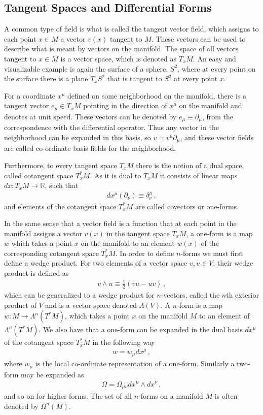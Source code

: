 \subsection*{Tangent Spaces and Differential Forms}
A common type of field is what is called the tangent vector field, which assigns to each point $x\in M$ a vector $v(x)$ tangent to $M$. These vectors can be used to describe what is meant by vectors  on the manifold. The space of all vectors tangent to $x\in M$ is a vector space, which is denoted as $T_{x}M$. An easy and visualizable example is again the surface of a sphere, $S^{2}$, where at every point on the surface there is a plane $T_{x}S^{2}$ that is tangent to $S^{2}$ at every point $x$.

For a coordinate $x^{\mu}$ defined on some neighborhood on the manifold, there is a tangent vector $e_{\mu}\in T_{x}M$ pointing in the direction of $x^{\mu}$ on the manifold and denotes  at unit speed. These vectors can be denoted by $e_{\mu}\equiv \partial_{\mu}$, from the correspondence with the differential operator. Thus any vector in the neighborhood can be expanded in this basis, so $v=v^{\mu}\partial_{\mu}$, and these vector fields are called co-ordinate basis fields for the neighborhood.

Furthermore, to every tangent space $T_{x}M$ there is the notion of a dual space, called cotangent space $T^{*}_{x}M$. As it is dual to $T_{x}M$ it consists of linear maps $dx:T_{x}M\rightarrow \mathbb{R}$, such that
\begin{align}
    dx^{\mu}(\partial_{\nu})\equiv \delta^{\mu}_{\nu}\,,
\end{align}
and elements of the cotangent space $T^{*}_{x}M$ are called covectors or one-forms.

In the same sense that a vector field is a function that at each point in the manifold assigns a vector $v(x)$ in the tangent space $T_{x}M$, a one-form is a map $w$ which takes a point $x$ on the manifold to an element $w(x)$ of the corresponding cotangent space $T^{*}_{x}M$. In order to define $n$-forms we must first define a wedge product. For two elements of a vector space $v,u\in V$, their wedge product is defined as
\begin{align}
    v\wedge u\equiv\frac{1}{2}(vu-uv)\,,
\end{align}
which can be generalized to a wedge product for $n$-vectors, called the $n$th exterior product of $V$ and is a vector space denoted $\Lambda(V)$. A $n$-form is a map $w:M\rightarrow \Lambda^{n}(T^{*}M)$, which takes a point $x$ on the manifold $M$ to an element of $\Lambda^{n}(T^{*}M)$. We also have that a one-form can be expanded in the dual basis $dx^{\mu}$ of the cotangent space $T^{*}_{x}M$ in the following way
\begin{align}
    w=w_{\mu}dx^{\mu}\,,
\end{align}
where $w_{\mu}$ is the local co-ordinate representation of a one-form. Similarly a two-form may be expanded as
\begin{align}
    \Omega=\Omega_{\mu\nu}dx^{\mu}\wedge dx^{\nu}\,,
\end{align}
and so on for higher forms. The set of all $n$-forms on a manifold $M$ is often denoted by $\Omega^{n}(M)$.

